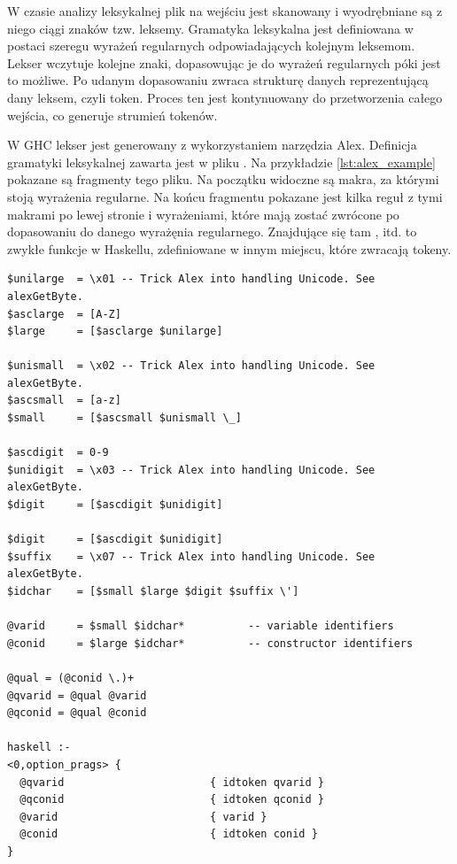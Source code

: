 W czasie analizy leksykalnej plik na wejściu jest skanowany i wyodrębniane są z niego ciągi znaków tzw. leksemy. Gramatyka leksykalna jest definiowana w postaci szeregu wyrażeń regularnych odpowiadających kolejnym leksemom. Lekser wczytuje kolejne znaki, dopasowując je do wyrażeń regularnych póki jest to możliwe. Po udanym dopasowaniu zwraca strukturę danych reprezentującą dany leksem, czyli token. Proces ten jest kontynuowany do przetworzenia całego wejścia, co generuje strumień tokenów.

W GHC lekser jest generowany z wykorzystaniem narzędzia Alex. Definicja gramatyki leksykalnej zawarta jest w pliku . Na przykładzie \ref{lst:alex_example} pokazane są fragmenty tego pliku. Na początku widoczne są makra, za którymi stoją wyrażenia regularne. Na końcu fragmentu pokazane jest kilka reguł z tymi makrami po lewej stronie i wyrażeniami, które mają zostać zwrócone po dopasowaniu do danego wyrażęnia regularnego. Znajdujące się tam ,  itd. to zwykłe funkcje w Haskellu, zdefiniowane w innym miejscu, które zwracają tokeny\cite{DocsAlex}.

\begin{lstlisting}[float,label={lst:alex_example},
                   caption={Wycinki z pliku \code{Lexer.x} składające się na reguły opisujące co jest wyodrębniane jako zmienna i konstruktor.}]
$unilarge  = \x01 -- Trick Alex into handling Unicode. See alexGetByte.
$asclarge  = [A-Z]
$large     = [$asclarge $unilarge]

$unismall  = \x02 -- Trick Alex into handling Unicode. See alexGetByte.
$ascsmall  = [a-z]
$small     = [$ascsmall $unismall \_]

$ascdigit  = 0-9
$unidigit  = \x03 -- Trick Alex into handling Unicode. See alexGetByte.
$digit     = [$ascdigit $unidigit]

$digit     = [$ascdigit $unidigit]
$suffix    = \x07 -- Trick Alex into handling Unicode. See alexGetByte.
$idchar    = [$small $large $digit $suffix \']

@varid     = $small $idchar*          -- variable identifiers
@conid     = $large $idchar*          -- constructor identifiers

@qual = (@conid \.)+
@qvarid = @qual @varid
@qconid = @qual @conid

haskell :-
<0,option_prags> {
  @qvarid                       { idtoken qvarid }
  @qconid                       { idtoken qconid }
  @varid                        { varid }
  @conid                        { idtoken conid }
}
\end{lstlisting}

